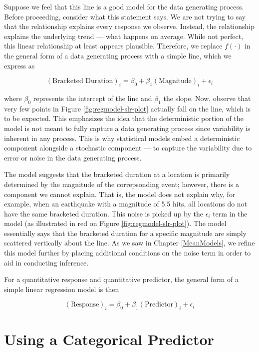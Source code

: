 \documentclass[
]{book}
\theoremstyle{plain}
\theoremstyle{mydefn}
\theoremstyle{myexmpl}
\theoremstyle{remark}
\begin{document}
Suppose we feel that this line is a good model for the data generating process. Before proceeding, consider what this statement says. We are not trying to say that the relationship explains every response we observe. Instead, the relationship explains the underlying trend --- what happens on average. While not perfect, this linear relationship at least appears plausible. Therefore, we replace \(f(\cdot)\) in the general form of a data generating process with a simple line, which we express as

\begin{equation}
  (\text{Bracketed Duration})_i = \beta_0 + \beta_1(\text{Magnitude})_i + \epsilon_i
  \label{eq:regmodel-slr}
\end{equation}

where \(\beta_0\) represents the intercept of the line and \(\beta_1\) the slope. Now, observe that very few points in Figure \ref{fig:regmodel-slr-plot} actually fall on the line, which is to be expected. This emphasizes the idea that the deterministic portion of the model is not meant to fully capture a data generating process since variability is inherent in any process. This is why statistical models embed a deterministic component alongside a stochastic component --- to capture the variability due to error or noise in the data generating process.

The model suggests that the bracketed duration at a location is primarily determined by the magnitude of the correpsonding event; however, there is a component we cannot explain. That is, the model does not explain why, for example, when an earthquake with a magnitude of 5.5 hits, all locations do not have the same bracketed duration. This noise is picked up by the \(\epsilon_i\) term in the model (as illustrated in red on Figure \ref{fig:regmodel-slr-plot}). The model essentially says that the bracketed duration for a specific magnitude are simply scattered vertically about the line. As we saw in Chapter \ref{MeanModels}, we refine this model further by placing additional conditions on the noise term in order to aid in conducting inference.

\begin{rmdtip}
For a quantitative response and quantitative predictor, the general form of a simple linear regression model is then

\[(\text{Response})_i = \beta_0 + \beta_1(\text{Predictor})_i + \epsilon_i\]
\end{rmdtip}

\hypertarget{using-a-categorical-predictor}{%
\section{Using a Categorical Predictor}\label{using-a-categorical-predictor}}
\end{document}
